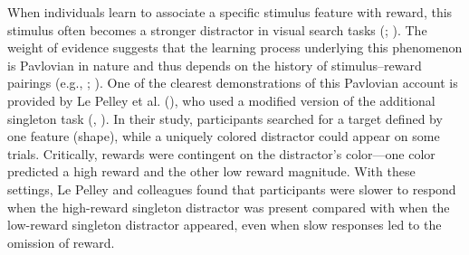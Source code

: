 \documentclass[
  man,
  floatsintext,
  longtable,
  nolmodern,
  notxfonts,
  notimes,
  mask,
  colorlinks=true,linkcolor=blue,citecolor=blue,urlcolor=blue]{apa7}
\begin{document}
When individuals learn to associate a specific stimulus feature with
reward, this stimulus often becomes a stronger distractor in visual
search tasks (;
). The weight of
evidence suggests that the learning process underlying this phenomenon
is Pavlovian in nature and thus depends on the history of
stimulus--reward pairings (e.g., ; ). One of
the clearest demonstrations of this Pavlovian account is provided by Le
Pelley et al. (), who used a modified
version of the additional singleton task
(,
). In their study, participants
searched for a target defined by one feature (shape), while a uniquely
colored distractor could appear on some trials. Critically, rewards were
contingent on the distractor's color---one color predicted a high reward
and the other low reward magnitude. With these settings, Le Pelley and
colleagues found that participants were slower to respond when the
high-reward singleton distractor was present compared with when the
low-reward singleton distractor appeared, even when slow responses led
to the omission of reward.
\end{document}
